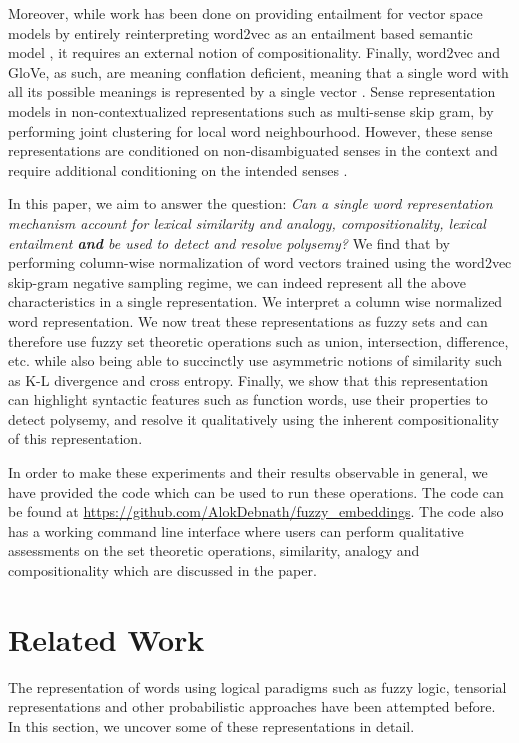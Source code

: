 \documentclass[11pt]{book}
\newcommand{\citep}[1]{\cite{#1}}
\begin{document}
Moreover, while work has been done on providing entailment for vector space
models by entirely reinterpreting word2vec as an entailment based semantic
model \citep{henderson2016vector}, it requires an external notion of
compositionality. Finally, word2vec and GloVe, as such, are meaning conflation
deficient, meaning that a single word with all its possible meanings is
represented by a single vector \citep{camacho2018word}. Sense representation
models in non-contextualized representations such as multi-sense skip gram, by
performing joint clustering for local word neighbourhood. However, these sense
representations are conditioned on non-disambiguated senses in the context and
require additional conditioning on the intended senses \citep{li2015multi}.

In this paper, we aim to answer the question: \textit{Can a single word
representation mechanism account for lexical similarity and analogy,
compositionality, lexical entailment \textbf{and} be used to detect and resolve
polysemy?} We find that by performing column-wise normalization of word vectors
trained using the word2vec skip-gram negative sampling regime, we can indeed
represent all the above characteristics in a single representation. We
interpret a column wise normalized word representation. We now treat these
representations as fuzzy sets and can therefore use fuzzy set theoretic
operations such as union, intersection, difference, etc. while also being able
to succinctly use asymmetric notions of similarity such as K-L divergence and
cross entropy. Finally, we show that this representation can highlight
syntactic features such as function words, use their properties to detect
polysemy, and resolve it qualitatively using the inherent compositionality of
this representation.

In order to make these experiments and their results observable in general, we
have provided the code which can be used to run these operations. The code can
be found at \url{https://github.com/AlokDebnath/fuzzy_embeddings}. The code
also has a working command line interface where users can perform qualitative
assessments on the set theoretic operations, similarity, analogy and
compositionality which are discussed in the paper.

\section{Related Work} \label{sec: related}

The representation of words using logical paradigms such as fuzzy logic,
tensorial representations and other probabilistic approaches have been
attempted before. In this section, we uncover some of these representations in
detail.
\end{document}
